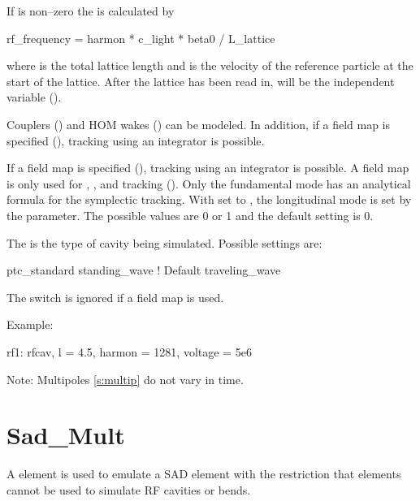 {If  is non--zero the  is calculated by
\begin{example}
  rf_frequency = harmon * c_light * beta0 / L_lattice 
\end{example}
where  is the total lattice length and  is the
velocity of the reference particle at the start of the lattice. After
the lattice has been read in,  will be the
independent variable ().

Couplers () and HOM wakes () can
be modeled. In addition, if a field map is specified
(), tracking using an integrator is possible.

If a field map is specified (), tracking using an integrator is possible. A field
map is only used for , , and  tracking
(). Only the fundamental mode has an analytical formula for the symplectic
tracking. With  set to , the longitudinal mode is set by the
 parameter. The possible values are 0 or 1 and the default setting is 0.

The  is the type of cavity being simulated. Possible
settings are:
\begin{example}
  ptc_standard
  standing_wave    ! Default
  traveling_wave
\end{example}
The  switch is ignored if a field map is used.

Example:
\begin{example}
  rf1: rfcav, l = 4.5, harmon = 1281, voltage = 5e6
\end{example}

Note: Multipoles \ref{s:multip} do not vary in time. 

\newpage

\section{Sad_Mult}
\label{s:sad.mult}

A  element is used to emulate a SAD\cite{b:sad}  element with the restriction
that  elements cannot be used to simulate RF cavities or bends.

}
